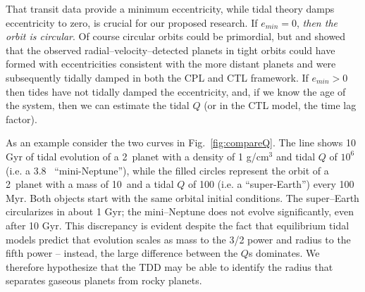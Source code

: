 \medskip
{\centerline{}}
\smallskip

That transit data provide a minimum eccentricity, while tidal theory
damps eccentricity to zero, is crucial for our proposed research. If
$e_{min} = 0$, \textit{then the orbit is circular}.  Of course
circular orbits could be primordial, but \cite{Jackson08}
and \cite{Matsumura10} showed that the observed
radial--velocity--detected planets in tight orbits could have formed
with eccentricities consistent with the more distant planets and were
subsequently tidally damped in both the CPL and CTL framework.  If
$e_{min} > 0$ then tides have not tidally damped the eccentricity,
and, if we know the age of the system, then we can estimate the tidal
$Q$ (or in the CTL model, the time lag factor).

As an example consider the two curves in Fig.~\ref{fig:compareQ}.  The
line shows 10 Gyr of tidal evolution of a 2~\rearth planet with a
density of 1 g/cm$^3$ and tidal $Q$ of $10^6$ (i.e. a 3.8~\mearth
``mini-Neptune''), while the filled circles represent the orbit of a
2~\rearth planet with a mass of 10~\mearth and a tidal $Q$ of 100
(i.e. a ``super-Earth'') every 100 Myr.  Both objects start with the
same orbital initial conditions.  The super--Earth circularizes in
about 1 Gyr; the mini--Neptune does not evolve significantly, even
after 10 Gyr.  This discrepancy is evident despite the fact that
equilibrium tidal models predict that evolution scales as mass to the
3/2 power and radius to the fifth power -- instead, the large
difference between the $Q$s dominates.  We therefore hypothesize that
the TDD may be able to identify the radius that separates gaseous
planets from rocky planets.

